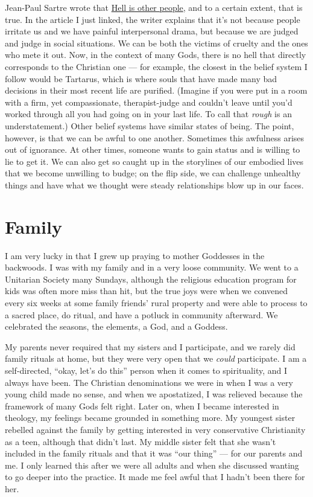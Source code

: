 \documentclass[
]{book}
\begin{document}
Jean-Paul Sartre wrote that \href{https://www.vox.com/2014/11/17/7229547/philosophy-quotes-misunderstood-wittgenstein-sartre-descartes}{Hell is other people}, and to a certain extent, that is true. In the article I just linked, the writer explains that it's not because people irritate us and we have painful interpersonal drama, but because we are judged and judge in social situations. We can be both the victims of cruelty and the ones who mete it out. Now, in the context of many Gods, there is no hell that directly corresponds to the Christian one --- for example, the closest in the belief system I follow would be Tartarus, which is where souls that have made many bad decisions in their most recent life are purified. (Imagine if you were put in a room with a firm, yet compassionate, therapist-judge and couldn't leave until you'd worked through all you had going on in your last life. To call that \emph{rough} is an understatement.) Other belief systems have similar states of being. The point, however, is that we can be awful to one another. Sometimes this awfulness arises out of ignorance. At other times, someone wants to gain status and is willing to lie to get it. We can also get so caught up in the storylines of our embodied lives that we become unwilling to budge; on the flip side, we can challenge unhealthy things and have what we thought were steady relationships blow up in our faces.

\hypertarget{family}{%
\section{Family}\label{family}}

I am very lucky in that I grew up praying to mother Goddesses in the backwoods. I was with my family and in a very loose community. We went to a Unitarian Society many Sundays, although the religious education program for kids was often more miss than hit, but the true joys were when we convened every six weeks at some family friends' rural property and were able to process to a sacred place, do ritual, and have a potluck in community afterward. We celebrated the seasons, the elements, a God, and a Goddess.

My parents never required that my sisters and I participate, and we rarely did family rituals at home, but they were very open that we \emph{could} participate. I am a self-directed, ``okay, let's do this'' person when it comes to spirituality, and I always have been. The Christian denominations we were in when I was a very young child made no sense, and when we apostatized, I was relieved because the framework of many Gods felt right. Later on, when I became interested in theology, my feelings became grounded in something more. My youngest sister rebelled against the family by getting interested in very conservative Christianity as a teen, although that didn't last. My middle sister felt that she wasn't included in the family rituals and that it was ``our thing'' --- for our parents and me. I only learned this after we were all adults and when she discussed wanting to go deeper into the practice. It made me feel awful that I hadn't been there for her.
\end{document}
